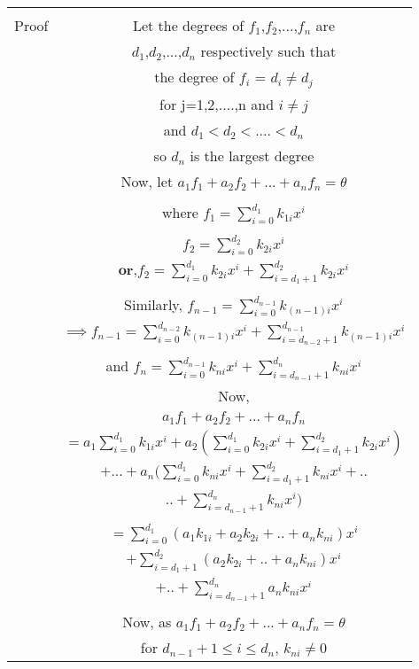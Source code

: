 \begin{table}[ht!]
\begin{center}
\begin{tabular}{|c|c|}
\hline
& \\
Proof & Let the degrees of $f_1$,$f_2$,...,$f_n$ are\\
& $d_1$,$d_2$,...,$d_n$ respectively such that\\
& the degree of $f_i$ = $d_i \neq d_j$\\
& for j=1,2,....,n and $i \neq j$\\
& and $d_1 < d_2 < ....< d_n$\\
& so $d_n$ is the largest degree\\
\hline
& Now, let $a_1f_1+a_2f_2+...+a_nf_n=\theta$\\
& \\
& where $f_1 = \sum_{i=0}^{d_1}k_{1i}x^i$\\
& \\
& $f_2 = \sum_{i=0}^{d_2}k_{2i}x^i$\\
& $\textbf{or,}f_2 = \sum_{i=0}^{d_1}k_{2i}x^i+ \sum_{i=d_1+1}^{d_2}k_{2i}x^i$\\
& \\
& Similarly, $f_{n-1}=\sum_{i=0}^{d_{n-1}}k_{(n-1)i}x^i$\\
& $\implies f_{n-1}= \sum_{i=0}^{d_{n-2}}k_{(n-1)i}x^i+ \sum_{i=d_{n-2}+1}^{d_{n-1}}k_{(n-1)i}x^i$\\
& \\
& and $f_n = \sum_{i=0}^{d_{n-1}}k_{ni}x^i+ \sum_{i=d_{n-1}+1}^{d_{n}}k_{ni}x^i$\\
\hline
& Now,\\
& $a_1f_1+a_2f_2+...+a_nf_n$\\
& $=a_1\sum_{i=0}^{d_1}k_{1i}x^i + a_2(\sum_{i=0}^{d_1}k_{2i}x^i+ \sum_{i=d_1+1}^{d_2}k_{2i}x^i)$\\
& $+ ...+a_n(\sum_{i=0}^{d_1}k_{ni}x^i+ \sum_{i=d_1+1}^{d_2}k_{ni}x^i+..$\\
& $..+\sum_{i=d_{n-1}+1}^{d_{n}}k_{ni}x^i)$\\
& \\
& $=\sum_{i=0}^{d_1}(a_1k_{1i}+a_2k_{2i}+..+a_nk_{ni})x^i$\\
& $+\sum_{i=d_1+1}^{d_2}(a_2k_{2i}+..+a_nk_{ni})x^i$\\
& $+..+\sum_{i=d_{n-1}+1}^{d_{n}}a_nk_{ni}x^i$\\
& \\
& Now, as $a_1f_1+a_2f_2+...+a_nf_n=\theta$ \\
& for $d_{n-1}+1\leq i \leq d_n$, $k_{ni}\neq 0$\\

\end{tabular}
\end{center}
\end{table}

